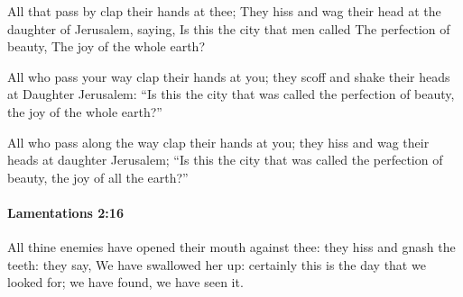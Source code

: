 			\begin{versebox}
					\item[BHS] 
					\item[LXX] 
					\item[ASV] All that pass by clap their hands at thee; They hiss and wag their head at the daughter of Jerusalem, saying, Is this the city that men called The perfection of beauty, The joy of the whole earth?
					\item[NIV] All who pass your way clap their hands at you; they scoff and shake their heads at Daughter Jerusalem: “Is this the city that was called the perfection of beauty, the joy of the whole earth?”
					\item[NRSV] All who pass along the way clap their hands at you; they hiss and wag their heads at daughter Jerusalem; “Is this the city that was called the perfection of beauty, the joy of all the earth?”
			\end{versebox}

		\paragraph{Lamentations 2:16} %
			\label{LAMENTATIONS-2-16}

			All thine enemies have opened their mouth against thee: they hiss and gnash the teeth: they say, We have swallowed her up: certainly this is the day that we looked for; we have found, we have seen it.

